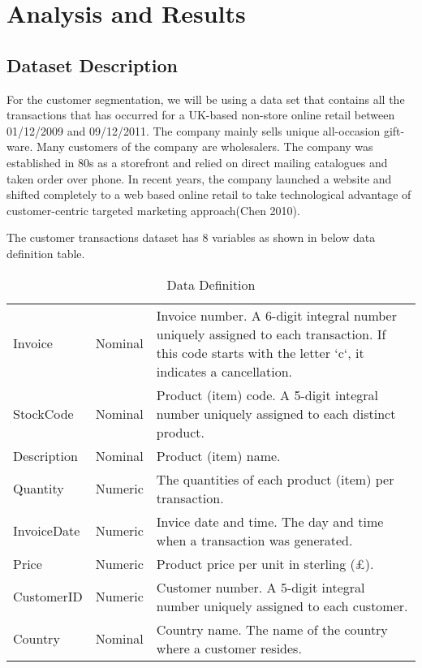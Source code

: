 \documentclass[
]{article}
\begin{document}
\hypertarget{analysis-and-results}{%
\section{Analysis and Results}\label{analysis-and-results}}

\hypertarget{dataset-description}{%
\subsection{Dataset Description}\label{dataset-description}}

For the customer segmentation, we will be using a data set that contains
all the transactions that has occurred for a UK-based non-store online
retail between 01/12/2009 and 09/12/2011. The company mainly sells
unique all-occasion gift-ware. Many customers of the company are
wholesalers. The company was established in 80s as a storefront and
relied on direct mailing catalogues and taken order over phone. In
recent years, the company launched a website and shifted completely to a
web based online retail to take technological advantage of
customer-centric targeted marketing approach(Chen 2010).

The customer transactions dataset has 8 variables as shown in below data
definition table.

\begin{table}

\caption{\label{tab:unnamed-chunk-2}Data Definition}
\centering
\begin{tabu} to 
\hline
{} &  & \\
\hline
Invoice & Nominal & Invoice number. A 6-digit integral number uniquely assigned to each transaction. If this code starts with the letter `c`, it indicates a cancellation.\\
\hline
StockCode & Nominal & Product (item) code. A 5-digit integral number uniquely assigned to each distinct product.\\
\hline
Description & Nominal & Product (item) name.\\
\hline
Quantity & Numeric & The quantities of each product (item) per transaction.\\
\hline
InvoiceDate & Numeric & Invice date and time. The day and time when a transaction was generated.\\
\hline
Price & Numeric & Product price per unit in sterling (£).\\
\hline
CustomerID & Numeric & Customer number. A 5-digit integral number uniquely assigned to each customer.\\
\hline
Country & Nominal & Country name. The name of the country where a customer resides.\\
\hline
\end{tabu}
\end{table}
\end{document}
